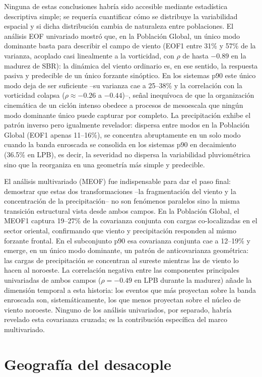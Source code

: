 Ninguna de estas conclusiones habría sido accesible mediante estadística descriptiva simple; se requería cuantificar cómo se distribuye la variabilidad espacial y si dicha distribución cambia de naturaleza entre poblaciones. El análisis EOF univariado mostró que, en la Población Global, un único modo dominante basta para describir el campo de viento (EOF1 entre 31\% y 57\% de la varianza, acoplado casi linealmente a la vorticidad, con $\rho$ de hasta $-0.89$ en la madurez de SBR): la dinámica del viento ordinario es, en ese sentido, la respuesta pasiva y predecible de un único forzante sinóptico. En los sistemas p90 este único modo deja de ser suficiente --su varianza cae a 25--38\% y la correlación con la vorticidad colapsa ($\rho \approx -0.26$ a $-0.44$)--, señal inequívoca de que la organización cinemática de un ciclón intenso obedece a procesos de mesoescala que ningún modo dominante único puede capturar por completo. La precipitación exhibe el patrón inverso pero igualmente revelador: dispersa entre modos en la Población Global (EOF1 apenas 11--16\%), se concentra abruptamente en un solo modo cuando la banda enroscada se consolida en los sistemas p90 en decaimiento (36.5\% en LPB), es decir, la severidad no dispersa la variabilidad pluviométrica sino que la reorganiza en una geometría más simple y predecible.

El análisis multivariado (MEOF) fue indispensable para dar el paso final: demostrar que estas dos transformaciones --la fragmentación del viento y la concentración de la precipitación-- no son fenómenos paralelos sino la misma transición estructural vista desde ambos campos. En la Población Global, el MEOF1 captura 19--27\% de la covarianza conjunta con cargas co-localizadas en el sector oriental, confirmando que viento y precipitación responden al mismo forzante frontal. En el subconjunto p90 esa covarianza conjunta cae a 12--19\% y emerge, en un único modo dominante, un patrón de anticovarianza geométrica: las cargas de precipitación se concentran al sureste mientras las de viento lo hacen al noroeste. La correlación negativa entre las componentes principales univariadas de ambos campos ($\rho = -0.49$ en LPB durante la madurez) añade la dimensión temporal a esta historia: los eventos que más proyectan sobre la banda enroscada son, sistemáticamente, los que menos proyectan sobre el núcleo de viento noroeste. Ninguno de los análisis univariados, por separado, habría revelado esta covarianza cruzada; es la contribución específica del marco multivariado.

\section{Geografía del desacople}

